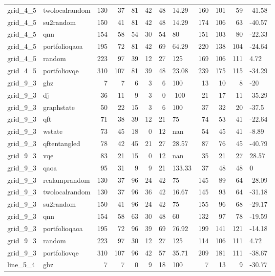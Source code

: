 \begin{longtable}{llrrrrrlrrrl}
grid\_4\_5 & twolocalrandom & 130 & 37 & 81 & 42 & 48 & 14.29 & 160 & 101 & 59 & -41.58 \\
grid\_4\_5 & su2random & 150 & 41 & 81 & 42 & 48 & 14.29 & 174 & 106 & 63 & -40.57 \\
grid\_4\_5 & qnn & 154 & 58 & 54 & 30 & 54 & 80 & 151 & 103 & 80 & -22.33 \\
grid\_4\_5 & portfolioqaoa & 195 & 72 & 81 & 42 & 69 & 64.29 & 220 & 138 & 104 & -24.64 \\
grid\_4\_5 & random & 223 & 97 & 39 & 12 & 27 & 125 & 169 & 106 & 111 & 4.72 \\
grid\_4\_5 & portfoliovqe & 310 & 107 & 81 & 39 & 48 & 23.08 & 239 & 175 & 115 & -34.29 \\
grid\_9\_3 & ghz & 7 & 7 & 6 & 3 & 6 & 100 & 13 & 10 & 8 & -20 \\
grid\_9\_3 & dj & 36 & 11 & 9 & 3 & 0 & -100 & 21 & 17 & 11 & -35.29 \\
grid\_9\_3 & graphstate & 50 & 22 & 15 & 3 & 6 & 100 & 37 & 32 & 20 & -37.5 \\
grid\_9\_3 & qft & 71 & 38 & 39 & 12 & 21 & 75 & 74 & 53 & 41 & -22.64 \\
grid\_9\_3 & wstate & 73 & 45 & 18 & 0 & 12 & nan & 54 & 45 & 41 & -8.89 \\
grid\_9\_3 & qftentangled & 78 & 42 & 45 & 21 & 27 & 28.57 & 87 & 76 & 45 & -40.79 \\
grid\_9\_3 & vqe & 83 & 21 & 15 & 0 & 12 & nan & 35 & 21 & 27 & 28.57 \\
grid\_9\_3 & qaoa & 95 & 31 & 9 & 9 & 21 & 133.33 & 37 & 48 & 48 & 0 \\
grid\_9\_3 & realamprandom & 130 & 37 & 96 & 24 & 42 & 75 & 145 & 89 & 64 & -28.09 \\
grid\_9\_3 & twolocalrandom & 130 & 37 & 96 & 36 & 42 & 16.67 & 145 & 93 & 64 & -31.18 \\
grid\_9\_3 & su2random & 150 & 41 & 96 & 24 & 42 & 75 & 155 & 96 & 68 & -29.17 \\
grid\_9\_3 & qnn & 154 & 58 & 63 & 30 & 48 & 60 & 132 & 97 & 78 & -19.59 \\
grid\_9\_3 & portfolioqaoa & 195 & 72 & 96 & 39 & 69 & 76.92 & 199 & 141 & 121 & -14.18 \\
grid\_9\_3 & random & 223 & 97 & 30 & 12 & 27 & 125 & 114 & 106 & 111 & 4.72 \\
grid\_9\_3 & portfoliovqe & 310 & 107 & 96 & 42 & 57 & 35.71 & 209 & 181 & 111 & -38.67 \\
line\_5\_4 & ghz & 7 & 7 & 0 & 9 & 18 & 100 & 7 & 13 & 9 & -30.77 \\

\end{longtable}
